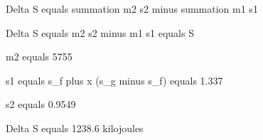 Delta S equals summation m2 s2 minus summation m1 s1  

Delta S equals m2 s2 minus m1 s1 equals S  

m2 equals 5755  

s1 equals s_f plus x (s_g minus s_f) equals 1.337  

s2 equals 0.9549  

Delta S equals 1238.6 kilojoules